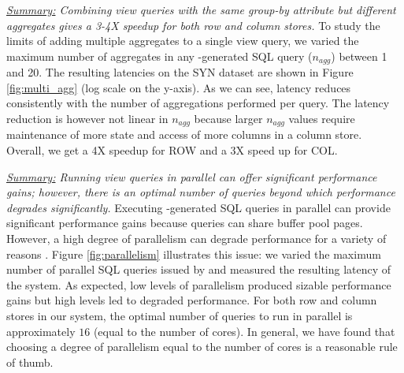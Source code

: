 {\em \underline{Summary:} Combining 
view queries with the same group-by attribute
but different aggregates gives a 
3-4X speedup for both row and column stores.}
To study the limits of adding multiple aggregates to a single view query, we
varied the maximum number of aggregates in any \SeeDB-generated SQL query 
($n_{agg}$) between 1 and 20.
The resulting latencies on the SYN dataset are shown in Figure \ref{fig:multi_agg} (log scale on the y-axis).
As we can see, latency reduces consistently with the number of aggregations performed 
per query.
The latency reduction is however not linear in $n_{agg}$ because
larger $n_{agg}$ values require maintenance of more state and access of more columns in a 
column store.
Overall, we get a 4X speedup for ROW and a 3X speed up for COL.

{\em \underline{Summary:} Running view queries in parallel can offer significant
performance gains; however, there is an optimal number of queries
beyond which performance degrades significantly.}
Executing \SeeDB-generated SQL queries in parallel can provide significant performance gains
because queries can share buffer pool pages.
However, a high degree of parallelism can degrade performance for a variety of reasons \cite{Postgres_wiki}. 
Figure \ref{fig:parallelism} illustrates this issue: we varied the maximum number of parallel SQL queries
issued by \SeeDB and measured the resulting latency of the system.
As expected, low levels of parallelism produced sizable performance gains but
high levels led to degraded performance.
For both row and column stores in our system, the optimal number of queries to 
run in parallel is approximately $16$ (equal to the number of cores). 
In general, we have found that choosing a degree of parallelism equal to the number of cores
is a reasonable rule of thumb. 

